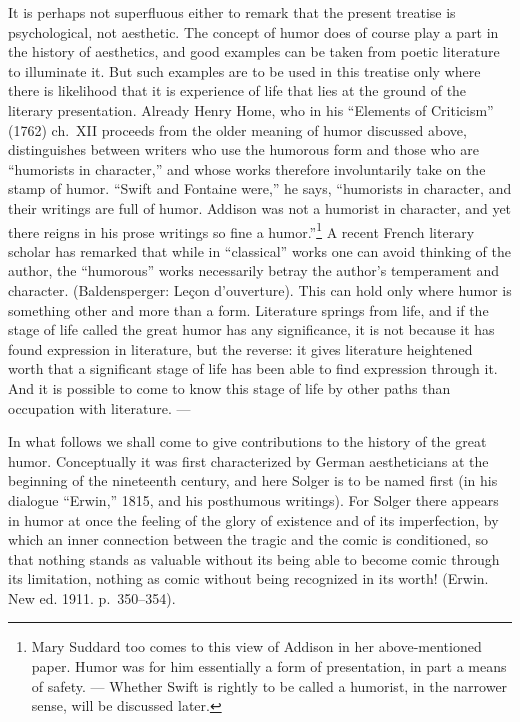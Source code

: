 \documentclass[12pt]{book}
\newcommand{\opage}[1]{\marginnote{\footnotesize\textit{[#1]}}}
\begin{document}
It is perhaps not superfluous either to remark that the present treatise is
psychological, not aesthetic. The concept of humor does of course play a part in
the history of aesthetics, and good examples can be taken from poetic literature to
illuminate it. But such examples are to be used in this treatise only where there
is likelihood that it is experience of life that lies at the ground of the literary
presentation. Already Henry Home, who in his ``Elements of Criticism'' (1762)
ch.~XII proceeds from the older meaning of humor discussed above, distinguishes
between writers who use the humorous form and those who are ``humorists in
character,'' and whose works therefore involuntarily take on the stamp of humor.
``Swift and Fontaine were,'' he says, ``humorists in character, and their
writings are full of humor. Addison was not a humorist in character, and yet there
reigns in his prose writings so fine a humor.''\footnote{Mary Suddard too comes to
this view of Addison in her above-mentioned paper. Humor was for him essentially a
form of presentation, in part a means of safety. --- Whether Swift is rightly to be
called a humorist, in the narrower sense, will be discussed later.} %
A recent French literary scholar has remarked that while in ``classical'' works
one can avoid thinking of the author, the ``humorous'' works necessarily betray the
author's \opage{47}temperament and character. (Baldensperger: Leçon d'ouverture).
This can hold only where humor is something other and more than a form. Literature
springs from life, and if the stage of life called the great humor has any
significance, it is not because it has found expression in literature, but the
reverse: it gives literature heightened worth that a significant stage of life has
been able to find expression through it. And it is possible to come to know this
stage of life by other paths than occupation with literature. ---

In what follows we shall come to give contributions to the history of the great
humor. Conceptually it was first characterized by German aestheticians at the
beginning of the nineteenth century, and here Solger is to be named first (in his
dialogue ``Erwin,'' 1815, and his posthumous writings). For Solger there appears in
humor at once the feeling of the glory of existence and of its imperfection, by
which an inner connection between the tragic and the comic is conditioned, so that
nothing stands as valuable without its being able to become comic through its
limitation, nothing as comic without being recognized in its worth! (Erwin. New ed.
1911. p.~350--354).
\end{document}
